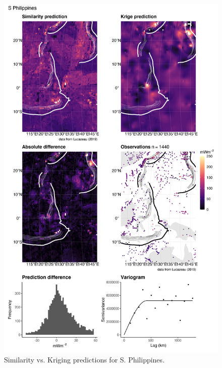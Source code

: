 \documentclass[draft,linenumbers]{agujournal2018}
\begin{document}
\begin{figure}[h]

{\centering \includegraphics[width=0.95\linewidth,]{../figs/diff/comp/S_Philippines} 

}

\caption{Similarity vs. Kriging predictions for S. Philippines.}\label{fig:s.philippines.comp}
\end{figure}
\end{document}
